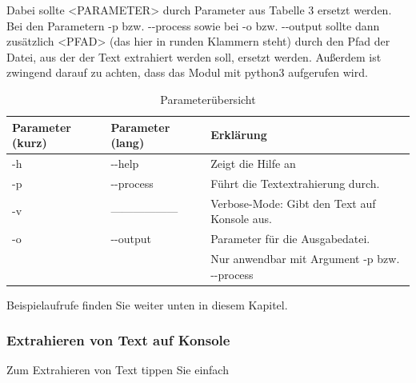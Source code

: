 \documentclass[12pt]{scrartcl}
\begin{document}
\newline
Dabei sollte <PARAMETER> durch Parameter aus Tabelle 3 ersetzt werden. Bei  den Parametern -p bzw. -{}-process sowie bei -o bzw. -{}-output sollte dann zusätzlich <PFAD> (das hier in runden Klammern steht) durch den Pfad der Datei, aus der der Text extrahiert werden soll, ersetzt werden. 
Außerdem ist zwingend darauf zu achten, dass das Modul mit python3 aufgerufen wird.
\begin{table}[H]
\begin{center}
\label{params}
\begin{tabular}{|l|l|l|}
\hline
\rowcolor[HTML]{C0C0C0} 
Parameter (kurz) & Parameter (lang) & Erklärung                                                                                                                              \\ \hline
-h               & -{}-help           & Zeigt die Hilfe an                                                                                                                     \\ \hline
-p               & -{}-process        & Führt die Textextrahierung durch.  \\ \hline
-v				 & ------------------ & Verbose-Mode: Gibt den Text auf Konsole aus. \\ \hline
-o               & -{}-output         & Parameter für die Ausgabedatei.\\
				 &					  &	Nur anwendbar mit Argument -p bzw. -{}-process \\ \hline
\end{tabular}
\caption{Parameterübersicht}
\end{center}
\end{table}

Beispielaufrufe finden Sie weiter unten in diesem Kapitel. 
\newpage
\subsubsection{Extrahieren von Text auf Konsole}
\label{sec:first-steps-extraction-console}
Zum Extrahieren von Text tippen Sie einfach	
\end{document}
